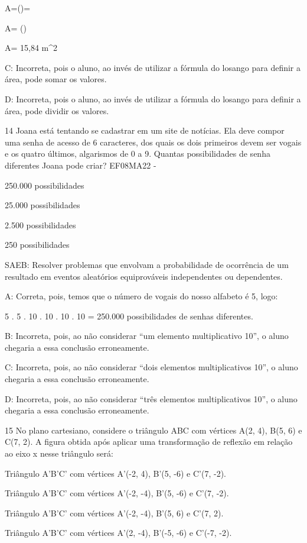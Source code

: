 {A=()=

A= ()

A= 15,84 m^2

C: Incorreta, pois o aluno, ao invés de utilizar a fórmula do losango
para definir a área, pode somar os valores.

D: Incorreta, pois o aluno, ao invés de utilizar a fórmula do losango
para definir a área, pode dividir os valores.

\num{14} Joana está tentando se cadastrar em um site de notícias. Ela deve
compor uma senha de acesso de 6 caracteres, dos quais os dois primeiros
devem ser vogais e os quatro últimos, algarismos de 0 a 9. Quantas
possibilidades de senha diferentes Joana pode criar? EF08MA22 -
\item 250.000 possibilidades
\item 25.000 possibilidades
\item 2.500 possibilidades
\item 250 possibilidades

SAEB: Resolver problemas que envolvam a probabilidade de ocorrência de
um resultado em eventos aleatórios equiprováveis independentes ou
dependentes.

A: Correta, pois, temos que o número de vogais do nosso alfabeto é 5,
logo:

5 . 5 . 10 . 10 . 10 . 10 = 250.000 possibilidades de senhas diferentes.

B: Incorreta, pois, ao não considerar ``um elemento multiplicativo 10'',
o aluno chegaria a essa conclusão erroneamente.

C: Incorreta, pois, ao não considerar ``dois elementos multiplicativos
10'', o aluno chegaria a essa conclusão erroneamente.

D: Incorreta, pois, ao não considerar ``três elementos multiplicativos
10'', o aluno chegaria a essa conclusão erroneamente.

\num{15} No plano cartesiano, considere o triângulo ABC com vértices A(2, 4),
B(5, 6) e C(7, 2). A figura obtida após aplicar uma transformação de
reflexão em relação ao eixo x nesse triângulo será:
\item Triângulo A'B'C' com vértices A'(-2, 4), B'(5, -6) e C'(7, -2).
\item Triângulo A'B'C' com vértices A'(-2, -4), B'(5, -6) e C'(7, -2).
\item Triângulo A'B'C' com vértices A'(-2, -4), B'(5, 6) e C'(7, 2).
\item Triângulo A'B'C' com vértices A'(2, -4), B'(-5, -6) e C'(-7, -2).

}

